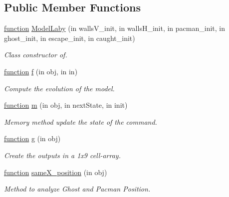 \subsection*{Public Member Functions}
\begin{DoxyCompactItemize}
\item 
\hyperlink{_plan__desuma_functions__2_players_8m_ac2ffb26d6f42d3bbcd7847b0873403f4}{function} \hyperlink{class_model_laby_a014d91cfa3ecf1a6fc3ca75ea4f433d4}{Model\+Laby} (in walls\+V\+\_\+init, in walls\+H\+\_\+init, in pacman\+\_\+init, in ghost\+\_\+init, in escape\+\_\+init, in caught\+\_\+init)
\begin{DoxyCompactList}\small\item\em Class constructor of. \end{DoxyCompactList}\item 
\hyperlink{_plan__desuma_functions__2_players_8m_ac2ffb26d6f42d3bbcd7847b0873403f4}{function} \hyperlink{class_model_laby_a6f3b146c92a207e95690d08975e1e072}{f} (in obj, in in)
\begin{DoxyCompactList}\small\item\em Compute the evolution of the model. \end{DoxyCompactList}\item 
\hyperlink{_plan__desuma_functions__2_players_8m_ac2ffb26d6f42d3bbcd7847b0873403f4}{function} \hyperlink{class_model_laby_a3140f24c6c4b80037b7d4f521c6ae2d3}{m} (in obj, in next\+State, in init)
\begin{DoxyCompactList}\small\item\em Memory method update the state of the command. \end{DoxyCompactList}\item 
\hyperlink{_plan__desuma_functions__2_players_8m_ac2ffb26d6f42d3bbcd7847b0873403f4}{function} \hyperlink{class_model_laby_a07dadfabe92bf9a144b8a862720e7746}{g} (in obj)
\begin{DoxyCompactList}\small\item\em Create the outputs in a 1x9 cell-\/array. \end{DoxyCompactList}\item 
\hyperlink{_plan__desuma_functions__2_players_8m_ac2ffb26d6f42d3bbcd7847b0873403f4}{function} \hyperlink{class_model_laby_ac2632946f3f89dcc57c9f1fd31bbfb53}{same\+X\+\_\+position} (in obj)
\begin{DoxyCompactList}\small\item\em Method to analyze Ghost and Pacman Position. \end{DoxyCompactList}\item 

\end{DoxyCompactItemize}
